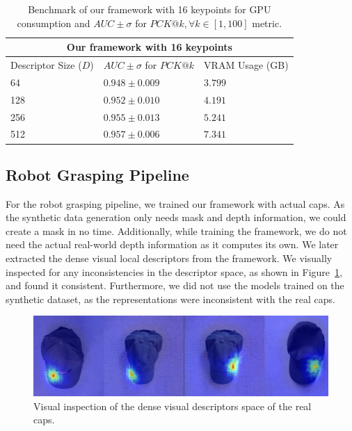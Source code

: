\begin{table}[htb]
    \caption{Benchmark of our framework with 16 keypoints for GPU consumption and $AUC \pm \sigma$ for $PCK@k,  \forall k \in [1, 100]$ metric.}
    \label{table:reduced_framework_training_results}
    \centering
    \begin{tabular}{lll}
        \toprule
        \multicolumn{3}{c}{Our framework with 16 keypoints}                    \\
        \midrule
        Descriptor Size ($D$) & $AUC \pm \sigma$ for $PCK@k$ & VRAM Usage (GB) \\ \hline
        64                    & $0.948 \pm 0.009$            & $3.799 $        \\
        128                   & $0.952 \pm 0.010$            & $4.191 $        \\
        256                   & $0.955 \pm 0.013$            & $5.241 $        \\
        512                   & $0.957 \pm 0.006$            & $7.341 $        \\
        \bottomrule
    \end{tabular}
\end{table}

\subsection{Robot Grasping Pipeline}

For the robot grasping pipeline, we trained our framework with actual caps.
As the synthetic data generation only needs mask and depth information, we could create a mask in no time.
Additionally, while training the framework, we do not need the actual real-world depth information as it computes its own.
We later extracted the dense visual local descriptors from the framework.
We visually inspected for any inconsistencies in the descriptor space, as shown in Figure~\ref{fig:check_real_caps},
and found it consistent. Furthermore, we did not use the models trained on the synthetic dataset, as the representations were inconsistent with the real caps.

\begin{figure}[htb]
    \centering
    \includegraphics[scale=0.25]{images/test_real_caps.png}
    \caption{Visual inspection of the dense visual descriptors space of the real caps.}
    \label{fig:check_real_caps}
\end{figure}

